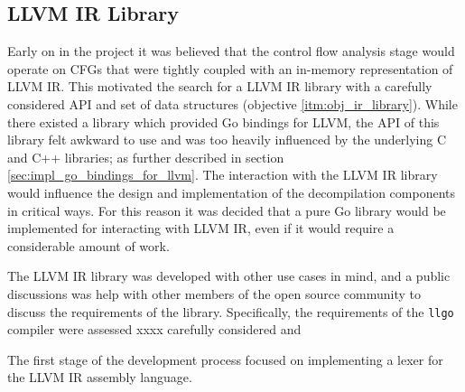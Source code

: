 
\subsection{LLVM IR Library}
\label{sec:impl_llvm_ir_library}

Early on in the project it was believed that the control flow analysis stage would operate on CFGs that were tightly coupled with an in-memory representation of LLVM IR. This motivated the search for a LLVM IR library with a carefully considered API and set of data structures (objective \ref{itm:obj_ir_library}). While there existed a library which provided Go bindings for LLVM, the API of this library felt awkward to use and was too heavily influenced by the underlying C and C++ libraries; as further described in section \ref{sec:impl_go_bindings_for_llvm}. The interaction with the LLVM IR library would influence the design and implementation of the decompilation components in critical ways. For this reason it was decided that a pure Go library would be implemented for interacting with LLVM IR, even if it would require a considerable amount of work.

The LLVM IR library was developed with other use cases in mind, and a public discussions was help with other members of the open source community to discuss the requirements of the library. Specifically, the requirements of the \texttt{llgo} compiler were assessed xxxx carefully considered and

The first stage of the development process focused on implementing a lexer for the LLVM IR assembly language.






